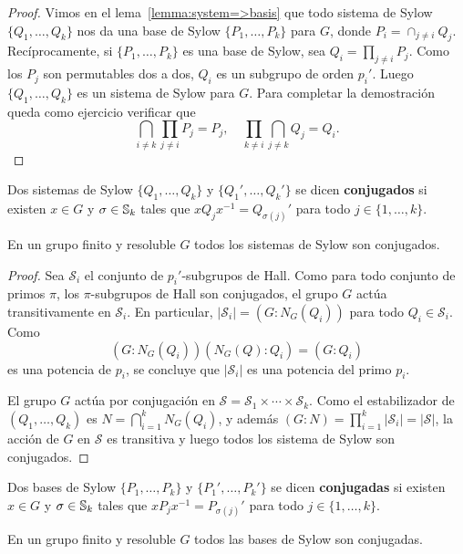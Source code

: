 \begin{proof}
	Vimos en el lema~\ref{lemma:system=>basis} que todo sistema de Sylow
	$\{Q_1,\dots,Q_k\}$ nos da una base de Sylow $\{P_1,\dots,P_k\}$ para $G$,
	donde $P_i=\cap_{j\ne i}Q_j$. Recíprocamente, si $\{P_1,\dots,P_k\}$ es una
	base de Sylow, sea $Q_i=\prod_{j\ne i}P_j$. Como los $P_j$ son permutables
	dos a dos, $Q_i$ es un subgrupo de orden $p_i'$. Luego $\{Q_1,\dots,Q_k\}$
	es un sistema de Sylow para $G$. Para completar la demostración queda
	como ejercicio verificar que 
	\[
	\bigcap_{i\ne k}\prod_{j\ne i}P_j=P_j,\quad
	\prod_{k\ne i}\bigcap_{j\ne k}Q_j=Q_i.
	\]
\end{proof}

Dos sistemas de Sylow $\{Q_1,\dots,Q_k\}$ y $\{Q_1',\dots,Q_k'\}$ se dicen
\textbf{conjugados} si existen $x\in G$ y $\sigma\in\mathbb{S}_k$ tales que $xQ_jx^{-1}=Q_{\sigma(j)}'$ para todo
$j\in\{1,\dots,k\}$.

\begin{theorem}
	\label{theorem:sistemas_conj}
	En un grupo finito y resoluble $G$ todos los sistemas de Sylow son conjugados.
\end{theorem}

\begin{proof}
	Sea $\mathcal{S}_i$ el conjunto de $p_i'$-subgrupos de Hall. Como para todo
	conjunto de primos $\pi$, los $\pi$-subgrupos de Hall son conjugados, el
	grupo $G$ actúa transitivamente en $\mathcal{S}_i$. En particular, 
	$|\mathcal{S}_i|=(G:N_G(Q_i))$ para todo $Q_i\in\mathcal{S}_i$. Como
	\[
	(G:N_G(Q_i))(N_G(Q):Q_i)=(G:Q_i)
	\]
	es una potencia de $p_i$, se concluye que $|\mathcal{S}_i|$ es una potencia
	del primo $p_i$.
	
	El grupo $G$ actúa por conjugación en
	$\mathcal{S}=\mathcal{S}_1\times\cdots\times\mathcal{S}_k$. Como el
	estabilizador de $(Q_1,\dots,Q_k)$ es $N=\bigcap_{i=1}^k N_G(Q_i)$, y
	además $(G:N)=\prod_{i=1}^k|\mathcal{S}_i|=|\mathcal{S}|$, la acción de $G$
	en $\mathcal{S}$ es transitiva y luego todos los sistema de Sylow son
	conjugados.
\end{proof}

Dos bases de Sylow $\{P_1,\dots,P_k\}$ y $\{P_1',\dots,P_k'\}$ se dicen
\textbf{conjugadas} 
si existen $x\in G$ y $\sigma\in\mathbb{S}_k$ tales que $xP_jx^{-1}=P_{\sigma(j)}'$ para todo
$j\in\{1,\dots,k\}$.

\begin{corollary}
	En un grupo finito y resoluble $G$ todos las bases de Sylow son conjugadas.
\end{corollary}

